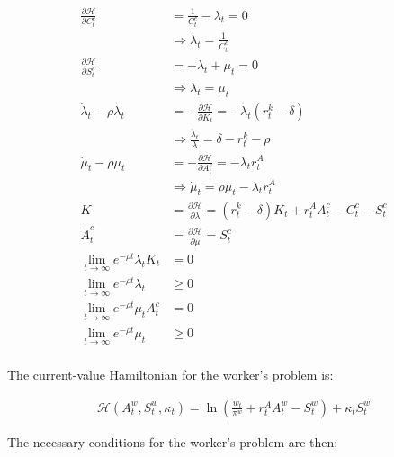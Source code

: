 \begin{align}
    \frac{\partial \mathcal{H}}{\partial C_t^c} &= \frac{1}{C_t^c} - \lambda_t = 0 \\
    &\Rightarrow \lambda_t = \frac{1}{C_t^c} \label{eq:pset_2023_24_ps2_q1_golosov_c_foc1} \\
    \frac{\partial \mathcal{H}}{\partial S_t^c} &= -\lambda_t + \mu_t = 0 \\
    &\Rightarrow \lambda_t = \mu_t \label{eq:pset_2023_24_ps2_q1_golosov_c_foc2} \\
    \dot{\lambda}_t - \rho \lambda_t &= -\frac{\partial \mathcal{H}}{\partial K_t} = -\lambda_t(r_t^k - \delta) \\
    &\Rightarrow \frac{\dot{\lambda}_t}{\lambda} = \delta -r_t^k - \rho \label{eq:pset_2023_24_ps2_q1_golosov_c_foc3} \\
    \dot{\mu}_t - \rho \mu_t &= -\frac{\partial \mathcal{H}}{\partial A_t^c} = 
    -\lambda_t r_t^A \\ 
    &\Rightarrow \dot{\mu}_t = \rho \mu_t - \lambda_t r_t^A \label{eq:pset_2023_24_ps2_q1_golosov_c_foc4} \\
    \dot{K} &= \frac{\partial \mathcal{H}}{\partial \lambda} =  (r_t^k - \delta) K_t + r_t^A A_t^c - C_t^c - S_t^c \label{eq:pset_2023_24_ps2_q1_golosov_c_foc5} \\
    \dot{A}_t^c &= \frac{\partial \mathcal{H}}{\partial \mu} = S_t^c \label{eq:pset_2023_24_ps2_q1_golosov_c_foc6} \\
    \underset{t \rightarrow \infty}{\lim} e^{-\rho t} \lambda_t K_t &= 0 \\
    \underset{t \rightarrow \infty}{\lim} e^{-\rho t} \lambda_t &\geq 0 \\
    \underset{t \rightarrow \infty}{\lim} e^{-\rho t} \mu_t A_t^c &= 0 \\
    \underset{t \rightarrow \infty}{\lim} e^{-\rho t} \mu_t &\geq 0 \\
\end{align}

The current-value Hamiltonian for the worker's problem is:

\begin{align}
    \mathcal{H}(A_t^w, S_t^w, \kappa_t) = \ln(\frac{w_t}{\pi^w} + r_t^A A_t^w - S_t^w) + \kappa_t S_t^w
\end{align}

The necessary conditions for the worker's problem are then:

